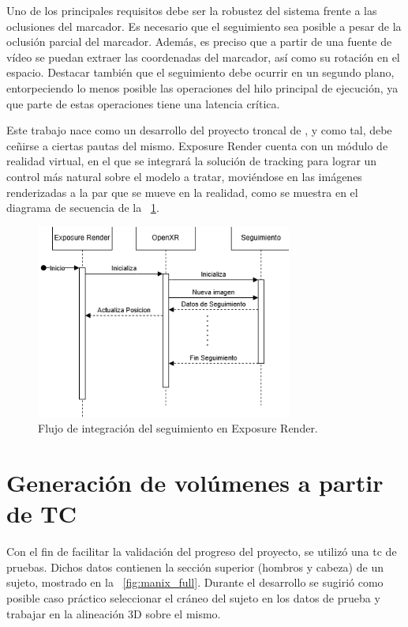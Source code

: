 Uno de los principales requisitos debe ser la robustez del sistema frente a las oclusiones del marcador. Es necesario que el seguimiento sea posible a pesar de la oclusión parcial del marcador. Además, es preciso que a partir de una fuente de vídeo se puedan extraer las coordenadas del marcador, así como su rotación en el espacio. Destacar también que el seguimiento debe ocurrir en un segundo plano, entorpeciendo lo menos posible las operaciones del hilo principal de ejecución, ya que parte de estas operaciones tiene una latencia crítica.

Este trabajo nace como un desarrollo del proyecto troncal de \citeauthor{IglesiasGuitian2022}, y como tal, debe ceñirse a ciertas pautas del mismo. Exposure Render cuenta con un módulo de realidad virtual, en el que se integrará la solución de tracking para lograr un control más natural sobre el modelo a tratar, moviéndose en las imágenes renderizadas a la par que se mueve en la realidad, como se muestra en el diagrama de secuencia de la \figurename~\ref{fig:flow_exposure}.

\begin{figure}
	\centering
	\includegraphics[width=0.75\textwidth]{imaxes/flow_exposure.png}
	\caption{Flujo de integración del seguimiento en Exposure Render.}
	\label{fig:flow_exposure}
\end{figure}

\section{Generación de volúmenes a partir de TC}
Con el fin de facilitar la validación del progreso del proyecto, se utilizó una \acrshort{tc} de pruebas. Dichos datos contienen la sección superior (hombros y cabeza) de un sujeto, mostrado en la \figurename~\ref{fig:manix_full}. Durante el desarrollo se sugirió como posible caso práctico seleccionar el cráneo del sujeto en los datos de prueba y trabajar en la alineación 3D sobre el mismo.


